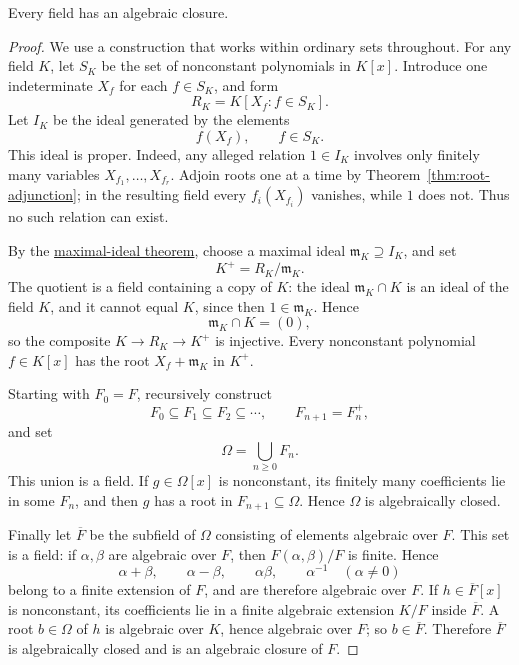 \begin{theorem}\label{thm:algebraic-closure-existence}
Every field has an algebraic closure.
\end{theorem}
\begin{proof}
We use a construction that works within ordinary sets throughout.  For any
field \(K\), let \(S_K\) be the set of nonconstant polynomials in \(K[x]\).
Introduce one indeterminate \(X_f\) for each \(f\in S_K\), and form
\[
R_K=K[X_f:f\in S_K].
\]
Let \(I_K\) be the ideal generated by the elements
\[
f(X_f),
\qquad
f\in S_K.
\]
This ideal is proper.  Indeed, any alleged relation \(1\in I_K\) involves
only finitely many variables \(X_{f_1},\ldots,X_{f_r}\).  Adjoin roots one at
a time by Theorem~\ref{thm:root-adjunction}; in the resulting field every
\(f_i(X_{f_i})\) vanishes, while \(1\) does not.  Thus no such relation can
exist.

By the \hyperref[thm:maximal-ideal-existence]{maximal-ideal theorem}, choose
a maximal ideal \(\mathfrak m_K\supseteq I_K\), and set
\[
K^+=R_K/\mathfrak m_K.
\]
The quotient is a field containing a copy of \(K\): the ideal
\(\mathfrak m_K\cap K\) is an ideal of the field \(K\), and it cannot equal
\(K\), since then \(1\in\mathfrak m_K\).  Hence
\[
\mathfrak m_K\cap K=(0),
\]
so the composite \(K\to R_K\to K^+\) is injective.  Every nonconstant
polynomial \(f\in K[x]\) has the root \(X_f+\mathfrak m_K\) in \(K^+\).

Starting with \(F_0=F\), recursively construct
\[
F_0\subseteq F_1\subseteq F_2\subseteq\cdots,
\qquad
F_{n+1}=F_n^+,
\]
and set
\[
\Omega=\bigcup_{n\geq0}F_n.
\]
This union is a field.  If \(g\in\Omega[x]\) is nonconstant, its finitely
many coefficients lie in some \(F_n\), and then \(g\) has a root in
\(F_{n+1}\subseteq\Omega\).  Hence \(\Omega\) is algebraically closed.

Finally let \(\overline F\) be the subfield of \(\Omega\) consisting of
elements algebraic over \(F\).  This set is a field: if \(\alpha,\beta\) are
algebraic over \(F\), then \(F(\alpha,\beta)/F\) is finite.  Hence
\[
\alpha+\beta,\qquad \alpha-\beta,\qquad \alpha\beta,
\qquad \alpha^{-1}\quad(\alpha\ne0)
\]
belong to a finite extension of \(F\), and are therefore algebraic over \(F\).
If \(h\in\overline F[x]\) is nonconstant, its coefficients lie in a finite
algebraic extension \(K/F\) inside \(\overline F\).  A root \(b\in\Omega\)
of \(h\) is algebraic over \(K\), hence algebraic over \(F\); so
\(b\in\overline F\).  Therefore \(\overline F\) is algebraically closed and
is an algebraic closure of \(F\).
\end{proof}

